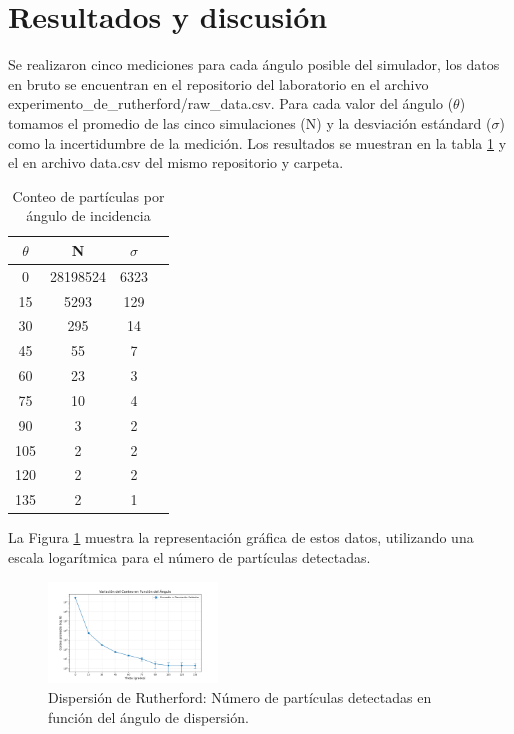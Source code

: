 \documentclass[twocolumn,a4paper,11pt]{scrartcl}
\begin{document}
\section{Resultados y discusión}

Se realizaron cinco mediciones para cada ángulo posible del simulador, los datos en bruto se encuentran en el repositorio del laboratorio \cite{BrianDL_laboratorio} en el archivo experimento\_de\_rutherford/raw\_data.csv. 
Para cada valor del ángulo ($\theta$) tomamos el promedio de las cinco simulaciones (N) y la desviación estándard ($\sigma$) como la incertidumbre de la medición. Los resultados se muestran en la tabla \ref{tab:data1} y el en archivo data.csv del mismo repositorio y carpeta.

\begin{table}[h]
  \centering
  \begin{tabular}{cccc}
  \hline
  $\theta$ & N & $\sigma$ \\
  \hline
  0 & 28198524 & 6323 \\
  15 & 5293 & 129 \\
  30 & 295 & 14 \\
  45 & 55 & 7 \\
  60 & 23 & 3 \\
  75 & 10 & 4 \\
  90 & 3 & 2 \\
  105 & 2 & 2 \\
  120 & 2 & 2 \\
  135 & 2 & 1 \\
  \hline
  \end{tabular}
  \caption{Conteo de partículas por ángulo de incidencia}
  \label{tab:data1}
  \end{table}

La Figura \ref{fig:rutherford_dispersion} muestra la representación gráfica de estos datos, utilizando una escala logarítmica para el número de partículas detectadas.

\begin{figure}[h]
\centering
\includegraphics[width=0.4\textwidth]{data.png}
\caption{Dispersión de Rutherford: Número de partículas detectadas en función del ángulo de dispersión.}
\label{fig:rutherford_dispersion}
\end{figure}
\end{document}
